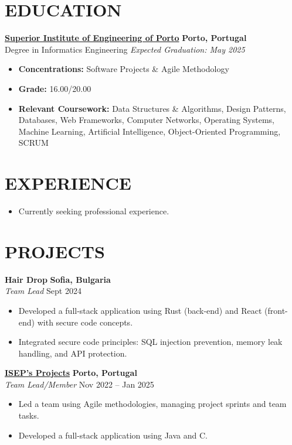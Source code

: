 \documentclass[10pt, letterpaper]{article}
\newenvironment{highlights}{
    \begin{itemize}[
        topsep=0.10 cm,
        parsep=0.10 cm,
        partopsep=0pt,
        itemsep=0pt,
        leftmargin=1cm %
    ]
}{
    \end{itemize}
}
\newenvironment{subhighlights}{
    \begin{itemize}[
        topsep=0.10 cm,
        parsep=0.10 cm,
        partopsep=0pt,
        itemsep=0pt,
        leftmargin=1.5cm, %
        label=$\vcenter{\hbox{\scriptsize$\circ$}}$ %
    ]
}{
    \end{itemize}
}
\begin{document}
\section{EDUCATION}
\textbf{\href{https://www.isep.ipp.pt}{Superior Institute of Engineering of Porto}} \hfill \textbf{Porto, Portugal} \\
Degree in Informatics Engineering \hfill \textit{Expected Graduation: May 2025} \\
\begin{subhighlights}
    \item \textbf{Concentrations:} Software Projects \& Agile Methodology
    \item \textbf{Grade:} 16.00/20.00
    \item \textbf{Relevant Coursework:} Data Structures \& Algorithms, Design Patterns, Databases, Web Frameworks, 
    Computer Networks, Operating Systems, Machine Learning, Artificial Intelligence, Object-Oriented Programming, SCRUM
\end{subhighlights}

\section{EXPERIENCE}
\begin{highlights}
    \item Currently seeking professional experience.
\end{highlights}
\section{PROJECTS}
\textbf{Hair Drop} \hfill \textbf{Sofia, Bulgaria} \\
\textit{Team Lead} \hfill Sept 2024 \\
\begin{highlights}
    \item Developed a full-stack application using Rust (back-end) and React (front-end) with secure code concepts.
    \item Integrated secure code principles: SQL injection prevention, memory leak handling, and API protection.
\end{highlights}

\textbf{\href{https://purenimble.github.io/projects}{ISEP’s Projects}} \hfill \textbf{Porto, Portugal} \\
\textit{Team Lead/Member} \hfill Nov 2022 – Jan 2025 \\
\begin{highlights}
    \item Led a team using Agile methodologies, managing project sprints and team tasks.
    \item Developed a full-stack application using Java and C.
\end{highlights}
\end{document}
